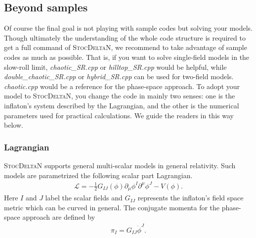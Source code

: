 \documentclass[aps, prd
, preprint
, nofootinbib 
, notitlepage
, superscriptaddress
, longbibliography
]{revtex4-1}
\newcommand{\dif}[2]{\frac{\mathrm{d} #1}{\mathrm{d} #2}}
\newcommand{\calL}{\mathcal{L}}
\newcommand{\bae}[1]{\begin{align} #1 \end{align}}
\newcommand{\YT}[1]{\textcolor{blue}{\sffamily [YT : #1]}}
\begin{document}
\subsection{Beyond samples}

Of course the final goal is not playing with sample codes but solving your models. Though ultimately the understanding of the whole code structure is required
to get a full command of \textsc{StocDeltaN}, we recommend to take advantage of sample codes as much as possible. That is, if you want to solve single-field models in the slow-roll limit,
\textit{chaotic\_SR.cpp} or \textit{hilltop\_SR.cpp} would be helpful, while \textit{double\_chaotic\_SR.cpp} or \textit{hybrid\_SR.cpp} can be used for two-field models. \textit{chaotic.cpp} would be a reference for the phase-space approach.
To adopt your model to \textsc{StocDeltaN}, you change the code in mainly two senses: one is the inflaton's system described by the Lagrangian, and the other is 
the numerical parameters used for practical calculations. We guide the readers in this way below.


\subsubsection{Lagrangian}

\textsc{StocDeltaN} supports general multi-scalar models in general relativity. Such models are parametrized the following scalar part Lagrangian.
\bae{\label{eq: Lagrangian}
	\calL=-\frac{1}{2}G_{IJ}(\phi)\partial_\mu\phi^I\partial^\mu\phi^J-V(\phi).
}
Here $I$ and $J$ label the scalar fields and $G_{IJ}$ represents the inflaton's field space metric which can be curved in general.
The conjugate momenta for the phase-space approach are defined by \YT{$G_{IJ}\dif{\phi^J}{N}$ is better?}
\bae{
    \pi_I=G_{IJ}\dot{\phi}^J. 
}
\end{document}

